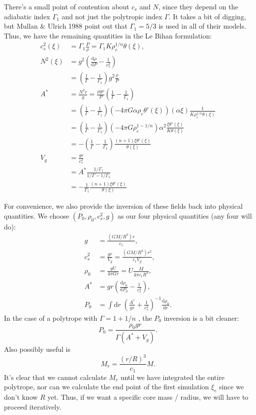 \documentclass[11pt,
        usenames, %
        twocolumn,
        landscape,
        dvipsnames %
    ]{article}
\newcommand*{\rd}[2]{\frac{\mathrm{d}#1}{\mathrm{d}#2}}
\newcommand*{\p}[1]{\left(#1\right)}
\begin{document}
There's a small point of contention about $c_s$ and $N$, since they depend on
the adiabatic index $\Gamma_1$ and not just the polytropic index $\Gamma$. It
takes a bit of digging, but Mullan \& Ulrich 1988 point out that $\Gamma_1 =
5/3$ is used in all of their models. Thus, we have the remaining quantities in
the Le Bihan formulation:
\begin{align}
    c_s^2(\xi) &= \Gamma_1\frac{P}{\rho} = \Gamma_1 K\rho_c^{1/n}\theta(\xi)
        ,\\
    N^2(\xi) &= g^2\p{\rd{\rho}{P} - \frac{1}{c_s^2}}\nonumber\\
        &= \p{\frac{1}{\Gamma} - \frac{1}{\Gamma_1}}
            g^2\frac{\rho}{P}\nonumber\\
    A^* &= \frac{N^2r}{g} = \frac{\rho gr}{P}\p{\frac{1}{\Gamma} -
            \frac{1}{\Gamma_1}}\nonumber\\
        &= \p{\frac{1}{\Gamma} - \frac{1}{\Gamma_1}}
            \p{-4\pi G \alpha \rho_c \theta'(\xi)}\p{\alpha \xi}
            \frac{1}{K\rho_c^{1/n}\theta(\xi)}\nonumber\\
        &= \p{\frac{1}{\Gamma} - \frac{1}{\Gamma_1}}
            \p{-4\pi G \rho_c^{1 - 1/n}}
                \alpha^2
            \frac{\xi \theta'(\xi)}{K\theta(\xi)}\nonumber\\
        &= -\p{\frac{1}{\Gamma} - \frac{1}{\Gamma_1}}
            \frac{(n + 1)\xi \theta'(\xi)}{\theta(\xi)}\nonumber\\
    V_g &= \frac{gr}{c_s^2}\nonumber\\
        &= A^* \frac{1 / \Gamma_1}{1 / \Gamma - 1 / \Gamma_1}\nonumber\\
        &= -\frac{1}{\Gamma_1} \frac{(n + 1)\xi \theta'(\xi)}{\theta(\xi)}
\end{align}

For convenience, we also provide the inversion of these fields back into
physical quantities. We choose $(P_0, \rho_0, c_s^2, g)$ as our four physical
quantities (any four will do):
\begin{align}
    g &= \frac{(GM / R^3) r}{c_1},\\
    c_s^2 &= \frac{gr}{V_g}
        = \frac{(GM / R^3) r^2}{c_1V_g},\\
    \rho_0 &= \frac{gU}{4\pi G r} = U\frac{M}{4\pi c_1R^3},\\
    A^* &= gr\p{\rd{\rho_0}{P_0} - \frac{1}{c_s^2}},\nonumber\\
    P_0 &= \int\limits\mathrm{d}r\;
        \p{\frac{A^*}{gr} + \frac{1}{c_s^2}}^{-1}
        \rd{\rho_0}{r}.
\end{align}
In the case of a polytrope with $\Gamma = 1 + 1 / n$ , the $P_0$ inversion is a
bit cleaner:
\begin{equation}
    P_0 = \frac{\rho_0 gr}{\Gamma (A^* + V_g)}.
\end{equation}
Also possibly useful is
\begin{equation}
    M_r = \frac{(r / R)^3}{c_1}M.
\end{equation}
It's clear that we cannot calculate $M_r$ until we have integrated the entire
polytrope, nor can we calculate the end point of the first simulation $\xi_c$
since we don't know $R$ yet. Thus, if we want a specific core mass / radius, we
will have to proceed iteratively.
\end{document}
